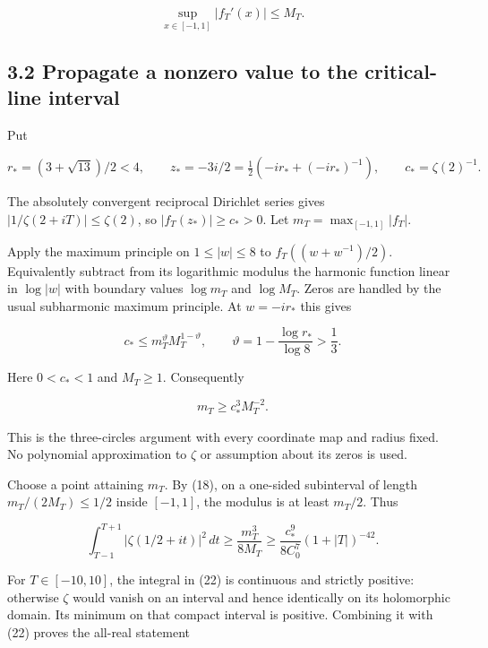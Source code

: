 \[
 \sup_{x\in[-1,1]}|f_T'(x)|\le M_T.                                    \tag{18}
\]

\subsection{3.2 Propagate a nonzero value to the critical-line
interval}\label{GraphV2:propagate-a-nonzero-value-to-the-critical-line-interval}

Put

\[
 r_*=(3+\sqrt{13})/2<4,\qquad
 z_*=-3i/2=\tfrac12(-ir_*+(-ir_*)^{-1}),\qquad
 c_* =\zeta(2)^{-1}.                                                    \tag{19}
\]

The absolutely convergent reciprocal Dirichlet series gives
\(|1/\zeta(2+iT)|\le\zeta(2)\), so \(|f_T(z_*)|\ge c_*>0\). Let
\(m_T=\max_{[-1,1]}|f_T|\).

Apply the maximum principle on \(1\le|w|\le8\) to \(f_T((w+w^{-1})/2)\).
Equivalently subtract from its logarithmic modulus the harmonic function
linear in \(\log|w|\) with boundary values \(\log m_T\) and
\(\log M_T\). Zeros are handled by the usual subharmonic maximum
principle. At \(w=-ir_*\) this gives

\[
 c_*\le m_T^{\vartheta}M_T^{1-\vartheta},\qquad
 \vartheta=1-\frac{\log r_*}{\log8}>\frac13.
                                                                         \tag{20}
\]

Here \(0<c_*<1\) and \(M_T\ge1\). Consequently

\[
 m_T\ge c_*^3M_T^{-2}.                                                 \tag{21}
\]

This is the three-circles argument with every coordinate map and radius
fixed. No polynomial approximation to \(\zeta\) or assumption about its
zeros is used.

Choose a point attaining \(m_T\). By (18), on a one-sided subinterval of
length \(m_T/(2M_T)\le1/2\) inside \([-1,1]\), the modulus is at least
\(m_T/2\). Thus

\[
 \int_{T-1}^{T+1}|\zeta(1/2+it)|^2\,dt
 \ge \frac{m_T^3}{8M_T}
 \ge \frac{c_*^9}{8C_0^7}(1+|T|)^{-42}.                                \tag{22}
\]

For \(T\in[-10,10]\), the integral in (22) is continuous and strictly
positive: otherwise \(\zeta\) would vanish on an interval and hence
identically on its holomorphic domain. Its minimum on that compact
interval is positive. Combining it with (22) proves the all-real
statement

